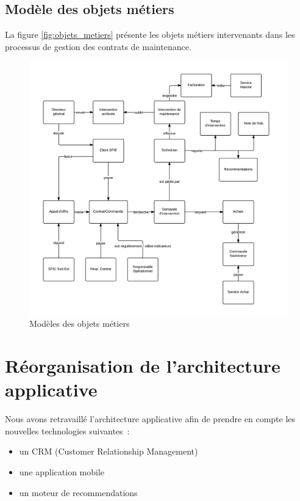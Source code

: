 \pagebreak
\subsection{Modèle des objets métiers}

La figure \vref{fig:objets_metiers} présente les objets métiers intervenants dans les processus de gestion des contrats de maintenance.

\begin{figure}[h!]
	\centering
	\includegraphics[width=1\linewidth]{images/modele_objet_metier.png}
	\caption{Modèles des objets métiers}
	\label{fig:objets_metiers}
\end{figure}


\pagebreak
\section{Réorganisation de l'architecture applicative}

Nous avons retravaillé l'architecture applicative afin de prendre en compte les nouvelles technologies suivantes~:

    \begin{itemize}
        \item un CRM (Customer Relationship Management)
        \item une application mobile
        \item un moteur de recommendations
    \end{itemize}

